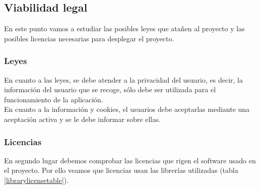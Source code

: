 \subsection{Viabilidad legal}

En este punto vamos a estudiar las posibles leyes que atañen al proyecto y las posibles licencias necesarias para desplegar el proyecto.

\subsubsection{Leyes}

En cuanto a las leyes, se debe atender a la privacidad del usuario, es decir, la información del usuario que se recoge, sólo debe ser utilizada para el funcionamiento de la aplicación. \\
En cuanto a la información y cookies, el usuarios debe aceptarlas mediante una aceptación activa y se le debe informar sobre ellas.

\subsubsection{Licencias}

En segundo lugar debemos comprobar las licencias que rigen el software usado en el proyecto.
Por ello veamos que licencias usan las librerías utilizadas (tabla \ref{librarylicensetable}).

